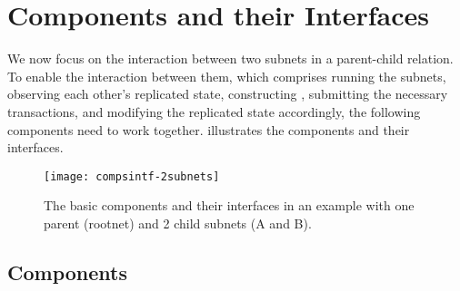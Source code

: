  \section{Components and their Interfaces}
 \label{sec:components}

We now focus on the interaction between two subnets in a parent-child relation.
To enable the interaction between them, which comprises running the subnets, observing each other's replicated state,
constructing \pofsFull, submitting the necessary transactions, and modifying the replicated state accordingly,
the following components need to work together. 
 illustrates the components and their interfaces.\\

\begin{figure}[ht]
     \centering
     \texttt{[image: compsintf-2subnets]}
     \caption{The basic components and their interfaces in an example with one parent (rootnet) and 2 child subnets (A and B).}
     \label{fig:interfaces}
 \end{figure}

\subsection{Components}

